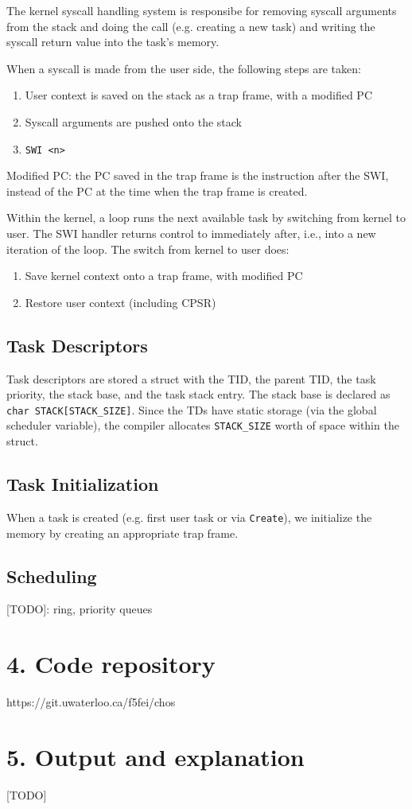 \documentclass{article}
\begin{document}
The kernel syscall handling system is responsibe for removing syscall arguments from the stack and doing the call (e.g. creating a new task) and writing the syscall return value into the task's memory.

When a syscall is made from the user side, the following steps are taken:

\begin{enumerate}
\item User context is saved on the stack as a trap frame, with a modified PC
\item Syscall arguments are pushed onto the stack
\item \texttt{SWI <n>}
\end{enumerate}

Modified PC: the PC saved in the trap frame is the instruction after the SWI, instead of the PC at the time when the trap frame is created.

Within the kernel, a loop runs the next available task by switching from kernel to user. The SWI handler returns control to immediately after, i.e., into a new iteration of the loop. The switch from kernel to user does:

\begin{enumerate}
\item Save kernel context onto a trap frame, with modified PC
\item Restore user context (including CPSR)
\end{enumerate}

\subsection*{Task Descriptors}

Task descriptors are stored a struct with the TID, the parent TID, the task priority, the stack base, and the task stack entry. The stack base is declared as \texttt{char STACK[STACK\_SIZE]}. Since the TDs have static storage (via the global scheduler variable), the compiler allocates \texttt{STACK\_SIZE} worth of space within the struct.

\subsection*{Task Initialization}

When a task is created (e.g. first user task or via \texttt{Create}), we initialize the memory by creating an appropriate trap frame.

\subsection*{Scheduling}

[TODO]: ring, priority queues

\section*{4. Code repository}

https://git.uwaterloo.ca/f5fei/chos

\section*{5. Output and explanation}

[TODO]
\end{document}
